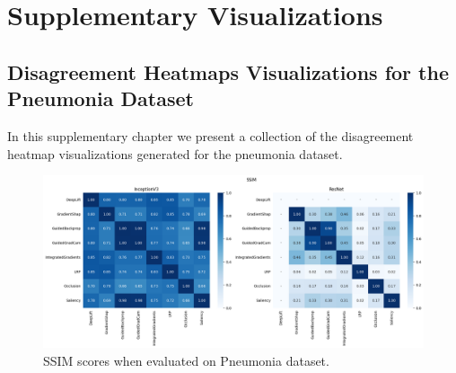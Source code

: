 \appendix

\chapter{Supplementary Visualizations}
\label{Appendix1}

\section{Disagreement Heatmaps Visualizations for the Pneumonia Dataset}
In this supplementary chapter we present a collection of the disagreement heatmap visualizations generated for the pneumonia dataset.

\begin{figure}[t]
    \centering
    \includegraphics[width=\textwidth]{images/results/pneumonia/ssim.png}
    \caption{SSIM scores when evaluated on Pneumonia dataset.}
    \label{fig:pneumonia_ssim}
\end{figure}


